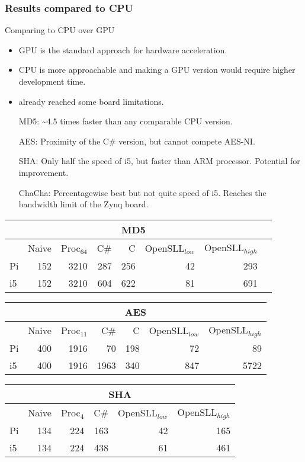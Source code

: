 \begin{frame}
  \frametitle{Results compared to CPU}
  \fontsize{4pt}{6}\selectfont
\begin{minipage}[b]{0.4\textwidth}
  \begin{tiny}
  Comparing to CPU over GPU
  \begin{itemize}
    \item GPU is the standard approach for hardware acceleration.
    \item CPU is more approachable and making a GPU version would require higher development time.
    \item already reached some board limitations.
  \end{itemize}
  \begin{itemize}
    \item[MD5:] \textasciitilde 4.5 times faster than any comparable CPU version.
    \item[AES:] Proximity of the C\# version, but cannot compete AES-NI.
    \item[SHA:] Only half the speed of i5, but faster than ARM processor. Potential for improvement.
    \item[ChaCha:] Percentagewise best but not quite speed of i5. Reaches the bandwidth limit of the Zynq board.
  \end{itemize}
  \end{tiny}
\end{minipage}
\qquad
\begin{minipage}[b]{0.55\textwidth}
\begin{tabular}{l r r r r r r r}
\multicolumn{7}{c}{MD5}\\
\hline
 & Naive & Proc$_{64}$ & C\# & C & OpenSLL$_{low}$ & OpenSLL$_{high}$\\
\hline
Pi & 152 & 3210 & 287 & 256 & 42 & 293\\
i5 & 152 & 3210 & 604 & 622 & 81 & 691
\end{tabular}

\begin{tabular}{l r r r r r r}
\multicolumn{7}{c}{AES}\\
\hline
 & Naive & Proc$_{11}$ & C\# & C & OpenSLL$_{low}$ & OpenSLL$_{high}$\\
\hline
Pi & 400 & 1916 &    70& 198 & 72  & 89\\
  i5 & 400 & 1916 & 1963& 340 & 847 & 5722
\end{tabular}
\begin{tabular}{l r r r r r}
\multicolumn{6}{c}{SHA}\\
\hline
 & Naive & Proc$_{4}$ & C\# & OpenSLL$_{low}$ & OpenSLL$_{high}$\\
\hline
Pi & 134 & 224 & 163 & 42 & 165\\
i5 & 134 & 224 & 438 & 61 & 461
\end{tabular}


\end{minipage}
\end{frame}
